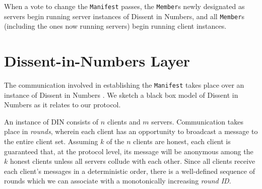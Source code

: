 When a vote to change the \texttt{Manifest} passes, the \texttt{Member}s newly
designated as servers begin running server instances of Dissent in Numbers, and
all \texttt{Member}s (including the ones now running servers) begin running
client instances.

\section{Dissent-in-Numbers Layer}
The communication involved in establishing the \texttt{Manifest} takes place
over an instance of Dissent in Numbers \cite{din}. We sketch a
black box model of Dissent in Numbers as it relates to our protocol.

An instance of DIN consists of $n$ clients and $m$ servers. Communication takes
place in \emph{rounds}, wherein each client has an opportunity to broadcast a
message to the entire client set. Assuming $k$ of the $n$ clients are honest,
each client is guaranteed that, at the protocol level, its message will be
anonymous among the $k$ honest clients unless all servers collude with each
other. Since all clients receive each client's
messages in a deterministic order, there is a well-defined sequence of rounds
which we can associate with a monotonically increasing \emph{round ID}.

